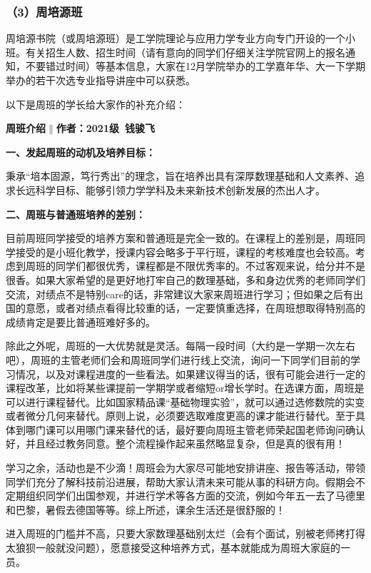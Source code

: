 \documentclass[11pt,oneside]{book}
\begin{document}
\subsubsection{（3）周培源班}

周培源书院（或周培源班）是工学院理论与应用力学专业方向专门开设的一个小班。有关招生人数、招生时间（请有意向的同学们仔细关注学院官网上的报名通知，不要错过时间）等基本信息，大家在12月学院举办的工学嘉年华、大一下学期举办的若干次选专业指导讲座中可以获悉。

以下是周班的学长给大家作的补充介绍：

\textbf{周班介绍$\parallel$作者：2021级\ 钱骏飞}

\textbf{\textbf{一、发起周班的动机及培养目标：}}

秉承“培本固源，笃行秀出”的理念，旨在培养出具有深厚数理基础和人文素养、追求长远科学目标、能够引领力学学科及未来新技术创新发展的杰出人才。

\textbf{\textbf{二、周班与普通班培养的差别：}}

目前周班同学接受的培养方案和普通班是完全一致的。在课程上的差别是，周班同学接受的是小班化教学，授课内容会略多于平行班，课程的考核难度也会较高。考虑到周班的同学们都很优秀，课程都是不限优秀率的。不过客观来说，给分并不是很香。如果大家希望的是更好地打牢自己的数理基础，多和身边优秀的老师同学们交流，对绩点不是特别care的话，非常建议大家来周班进行学习；但如果之后有出国的意愿，或者对绩点看得比较重的话，一定要慎重选择，在周班想取得特别高的成绩肯定是要比普通班难好多的。

除此之外呢，周班的一大优势就是灵活。每隔一段时间（大约是一学期一次左右吧），周班的主管老师们会和周班同学们进行线上交流，询问一下同学们目前的学习情况，以及对课程进度的一些看法。如果建议得当的话，很有可能会进行一定的课程改革，比如将某些课提前一学期学或者缩短or增长学时。在选课方面，周班是可以进行课程替代。比如国家精品课“基础物理实验”，就可以通过选修数院的实变或者微分几何来替代。原则上说，必须要选取难度更高的课才能进行替代。至于具体到哪门课可以用哪门课来替代的话，最好要向周班主管老师荣起国老师询问确认好，并且经过教务同意。整个流程操作起来虽然略显复杂，但是真的很有用！

学习之余，活动也是不少滴！周班会为大家尽可能地安排讲座、报告等活动，带领同学们充分了解科技前沿进展，帮助大家认清未来可能从事的科研方向。假期会不定期组织同学们出国参观，并进行学术等各方面的交流，例如今年五一去了马德里和巴黎，暑假去德国等等。综上所述，课余生活还是很舒服的！

进入周班的门槛并不高，只要大家数理基础别太烂（会有个面试，别被老师拷打得太狼狈一般就没问题），愿意接受这种培养方式，基本就能成为周班大家庭的一员。
\end{document}
